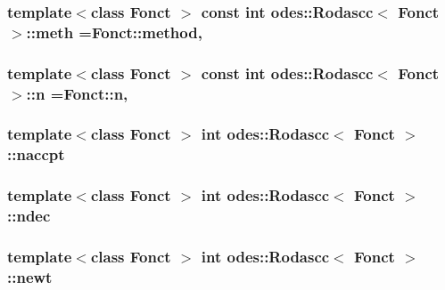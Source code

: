 \hypertarget{classodes_1_1Rodascc_a00163c374fb9d95e240c696a4b764984}{
\subsubsection[{meth}]{\setlength{\rightskip}{0pt plus 5cm}template$<$class Fonct $>$ const int {\bf odes\-::\-Rodascc}$<$ Fonct $>$\-::meth =Fonct\-::method\hspace{0.3cm}{\ttfamily [static]}, {\ttfamily [private]}}}\label{classodes_1_1Rodascc_a00163c374fb9d95e240c696a4b764984}
\hypertarget{classodes_1_1Rodascc_a7a4cb0d10f0154fed837031863bb491d}{
\subsubsection[{n}]{\setlength{\rightskip}{0pt plus 5cm}template$<$class Fonct $>$ const int {\bf odes\-::\-Rodascc}$<$ Fonct $>$\-::n =Fonct\-::n\hspace{0.3cm}{\ttfamily [static]}, {\ttfamily [private]}}}\label{classodes_1_1Rodascc_a7a4cb0d10f0154fed837031863bb491d}
\hypertarget{classodes_1_1Rodascc_a212c00ac4a15a138ecaf952381d2addd}{
\subsubsection[{naccpt}]{\setlength{\rightskip}{0pt plus 5cm}template$<$class Fonct $>$ int {\bf odes\-::\-Rodascc}$<$ Fonct $>$\-::naccpt\hspace{0.3cm}{\ttfamily [private]}}}\label{classodes_1_1Rodascc_a212c00ac4a15a138ecaf952381d2addd}
\hypertarget{classodes_1_1Rodascc_a55cb51362c70bff92caeff3609b06454}{
\subsubsection[{ndec}]{\setlength{\rightskip}{0pt plus 5cm}template$<$class Fonct $>$ int {\bf odes\-::\-Rodascc}$<$ Fonct $>$\-::ndec\hspace{0.3cm}{\ttfamily [private]}}}\label{classodes_1_1Rodascc_a55cb51362c70bff92caeff3609b06454}
\hypertarget{classodes_1_1Rodascc_a66dcc7f2616b26cdf336361b35283885}{
\subsubsection[{newt}]{\setlength{\rightskip}{0pt plus 5cm}template$<$class Fonct $>$ int {\bf odes\-::\-Rodascc}$<$ Fonct $>$\-::newt\hspace{0.3cm}{\ttfamily [private]}}}\label{classodes_1_1Rodascc_a66dcc7f2616b26cdf336361b35283885}
